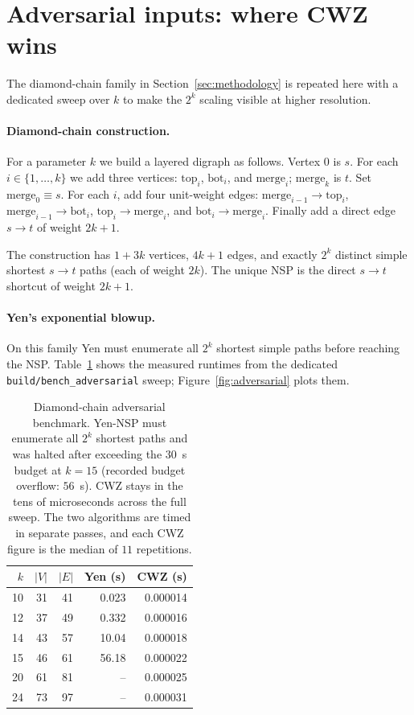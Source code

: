 \section{Adversarial inputs: where CWZ wins}
\label{sec:adversarial}

The diamond-chain family in Section~\ref{sec:methodology} is repeated here with a
dedicated sweep over $k$ to make the $2^{k}$ scaling visible at higher
resolution.

\paragraph{Diamond-chain construction.} For a parameter $k$ we build a
layered digraph as follows. Vertex $0$ is $s$. For each $i\in\{1,\dots,k\}$
we add three vertices: $\text{top}_i$, $\text{bot}_i$, and $\text{merge}_i$;
$\text{merge}_k$ is $t$. Set $\text{merge}_0\equiv s$. For each $i$, add
four unit-weight edges:
$\text{merge}_{i-1}\to\text{top}_i$, $\text{merge}_{i-1}\to\text{bot}_i$,
$\text{top}_i\to\text{merge}_i$, and $\text{bot}_i\to\text{merge}_i$.
Finally add a direct edge $s\to t$ of weight $2k+1$.

The construction has $1+3k$ vertices, $4k+1$ edges, and exactly $2^{k}$
distinct simple shortest $s\to t$ paths (each of weight $2k$). The unique
NSP is the direct $s\to t$ shortcut of weight $2k+1$.

\paragraph{Yen's exponential blowup.} On this family Yen must enumerate
all $2^{k}$ shortest simple paths before reaching the NSP.
Table~\ref{tab:adv} shows the measured runtimes from the dedicated
\texttt{build/bench\_adversarial} sweep; Figure~\ref{fig:adversarial}
plots them.

\begin{table}[htbp]
  \centering
  \begin{tabular}{rrrrr}
  \toprule
  $k$ & $|V|$ & $|E|$ & Yen (s) & CWZ (s) \\
  \midrule
  10 & 31 & 41 & 0.023 & 0.000014 \\
  12 & 37 & 49 & 0.332 & 0.000016 \\
  14 & 43 & 57 & 10.04 & 0.000018 \\
  15 & 46 & 61 & 56.18 & 0.000022 \\
  20 & 61 & 81 & --   & 0.000025 \\
  24 & 73 & 97 & --   & 0.000031 \\
  \bottomrule
  \end{tabular}
  \caption{Diamond-chain adversarial benchmark. Yen-NSP must enumerate
    all $2^{k}$ shortest paths and was halted after exceeding the
    $30$~s budget at $k=15$ (recorded budget overflow:
    $56$~s). CWZ stays in the tens of microseconds across the full
    sweep. The two algorithms are timed in separate passes, and each CWZ
    figure is the median of $11$ repetitions.}
  \label{tab:adv}
\end{table}


